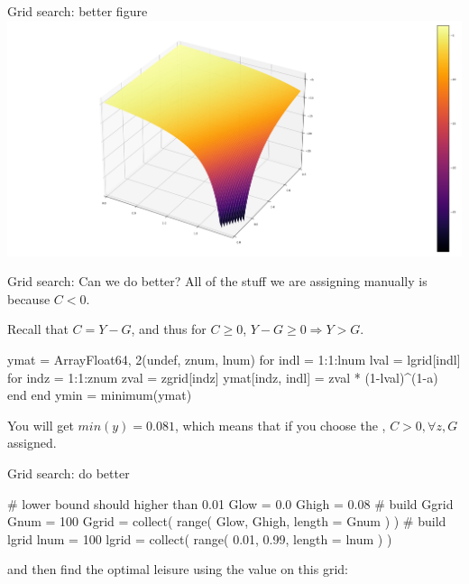 \documentclass[11pt,aspectratio=43,usenames,dvipsnames]{beamer}
\theoremstyle{definition}
\begin{document}
\begin{frame}{Grid search: better figure}
\label{slide:grid_search__better_figure}
    \includegraphics[width=\textwidth]{./figures/utilitygov_correct.png}
\end{frame}

\begin{frame}[fragile]{Grid search: Can we do better?}
\label{slide:Grid_search__Can_we_do_better_}
    All of the  stuff we are assigning manually is because $ C < 0 $.

    Recall that $ C = Y - G $, and thus for $ C \ge 0 $, $ Y - G \ge 0 \Rightarrow Y > G $.

\begin{juliacode}
    ymat = Array{Float64, 2}(undef, znum, lnum)
    for indl = 1:1:lnum
        lval = lgrid[indl]
        for indz = 1:1:znum
            zval = zgrid[indz]
            ymat[indz, indl] = zval * (1-lval)^(1-a)
        end
    end
    ymin = minimum(ymat)
\end{juliacode}

You will get $ min(y) = 0.081 $, which means that if you choose the , $ C > 0, \forall z, G $ assigned.

\end{frame}

\begin{frame}[fragile]{Grid search: do better}
\label{slide:Grid_search__do_better}

\begin{juliacode}
    # lower bound should higher than 0.01
    Glow = 0.0
    Ghigh = 0.08
    # build Ggrid
    Gnum = 100
    Ggrid = collect( range( Glow, Ghigh, length = Gnum ) )
    # build lgrid
    lnum = 100
    lgrid = collect( range( 0.01, 0.99, length = lnum ) )
\end{juliacode}

and then find the optimal leisure using the value on this grid:

\end{frame}
\end{document}
